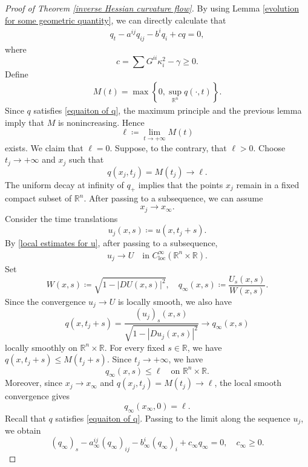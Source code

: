\documentclass[reqno]{amsart}
\theoremstyle{remark}
\theoremstyle{definition}
\numberwithin{equation}{section}
\begin{document}
\begin{proof}[Proof of Theorem \ref{inverse Hessian curvature flow}]
    By using Lemma \ref{evolution for some geometric quantity}, we can directly calculate that 
    \begin{align}\label{equaiton of q}
    q_t-a^{ij}q_{ij}-b^{i}q_{i}+cq=0,
    \end{align}
    where
    \[
    c 
    = \sum G^{ii}\kappa_i^2 - \gamma \geqslant 0.
    \]
    Define
    \begin{align}
        M(t) = \max\left\{0,\sup_{\mathbb R^n}q(\cdot,t)\right\}.
    \end{align}
    Since $q$ satisfies \eqref{equaiton of q}, the maximum principle and the previous lemma imply that $M$ is nonincreasing. Hence
    \[
    \ell \coloneqq \lim_{t\to+\infty}M(t)
    \]
    exists. We claim that $\ell=0$. Suppose, to the contrary, that $\ell>0$. Choose $t_j\to+\infty$ and $x_j$ such that
    \[
    q(x_j,t_j)=M(t_j)\to\ell.
    \]
    The uniform decay at infinity of $q_+$ implies that the points $x_j$ remain in a fixed compact subset of $\mathbb R^n$. After passing to a subsequence, we can assume 
    \[
    x_j\to x_\infty.
    \]
    Consider the time translations
    \[
    u_j(x,s) \coloneqq u(x,t_j+s).
    \]
    By \eqref{local estimates for u}, after passing to a subsequence,
    \begin{align}
    u_j \rightarrow U \quad \text{in } C^\infty_{\mathrm{loc}}(\mathbb R^n \times \mathbb R).
    \end{align}
    Set
    \[
    W(x,s)\coloneqq \sqrt{1-|DU(x,s)|^2}, \quad q_\infty(x,s)\coloneqq \frac{U_s(x,s)}{W(x,s)}.
    \]
    Since the convergence $u_j\to U$ is locally smooth, we also have
    \[
    q(x,t_j+s)=\frac{(u_j)_s(x,s)}{\sqrt{1-|Du_j(x,s)|^2}}\longrightarrow q_\infty(x,s)
    \]
    locally smoothly on $\mathbb R^n\times\mathbb R$. For every fixed $s\in\mathbb R$, we have $q(x,t_j+s)\leqslant M(t_j+s)$. Since $t_j\to+\infty$, we have
    \[
    q_\infty(x,s)\leqslant \ell \quad \text{on } \mathbb R^n\times\mathbb R.
    \]
    Moreover, since $x_j\to x_\infty$ and $q(x_j,t_j)=M(t_j)\to\ell$, the local smooth convergence gives
    \[
    q_\infty(x_\infty,0)=\ell.
    \]
    Recall that $q$ satisfies \eqref{equaiton of q}. Passing to the limit along the sequence $u_j$, we obtain
    \[
    (q_\infty)_s-a_\infty^{ij}(q_\infty)_{ij}-b_\infty^i(q_\infty)_i+c_\infty q_\infty=0, \quad c_\infty\geqslant 0.
\]
\end{proof}
\end{document}
